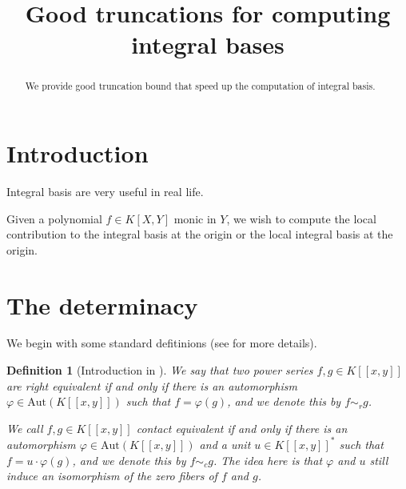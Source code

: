 \documentclass[a4paper,11pt,reqno]{amsart}%
\theoremstyle{definition}
\theoremstyle{plain}
\newtheorem{definition}{Definition}[section]
\theoremstyle{remark}
\begin{document}
\title[Good truncations for computing integral bases]{Good truncations for computing integral bases}

\begin{abstract}
We provide good truncation bound that speed up the computation of integral basis.
\end{abstract}
\maketitle

\section{Introduction}
\label{section:introduction}

Integral basis are very useful in real life.

Given a polynomial $f \in K[X,Y]$ monic in $Y$, we wish to compute the local contribution to the integral basis at the origin or the local integral basis at the origin.


\section{The determinacy}
\label{section:directApproach}

We begin with some standard defitinions (see \cite{Boubakri2012} for more details).

\begin{definition}[Introduction in \cite{Boubakri2012}]
We say that two power series \( f, g \in K[[x,y]] \) are \emph{right equivalent} if
and only if there is an automorphism \( \varphi \in \mathrm{Aut}(K[[x,y]]) \) such that \( f = \varphi(g) \), and we
denote this by \( f \sim_r g \).

We call \( f, g \in K[[x,y]] \) \emph{contact equivalent}
if and only if there is an automorphism \( \varphi \in \mathrm{Aut}(K[[x,y]]) \) and a unit
\( u \in K[[x,y]]^* \) such that \( f = u \cdot \varphi(g) \), and we denote this by \( f \sim_c g \).
The idea here is that \( \varphi \) and \( u \) still induce an isomorphism of the zero fibers of \( f \) and \( g \).
\end{definition}
\end{document}
